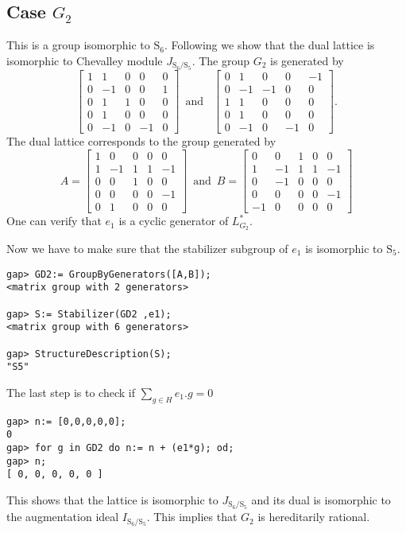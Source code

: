 \documentclass{article}
\theoremstyle{plain}
\theoremstyle{definition}
\begin{document}
\subsection{Case $G_2$}
This is a group isomorphic to $\mathrm{S}_6$. Following \cite{Nicole1} we show that the dual lattice is isomorphic to Chevalley module $J_{\mathrm{S}_6/\mathrm{S}_5}$. The group $G_2$ is generated by 
$$
 \left[ \begin {array}{ccccc} 1&1&0&0&0\\  0&-1&0&0&1
\\  0&1&1&0&0\\  0&1&0&0&0
\\  0&-1&0&-1&0\end {array} \right] 
\,\,\, \text{and } \,\,\,
 \left[ \begin {array}{ccccc} 0&1&0&0&-1\\  0&-1&-1&0
&0\\  1&1&0&0&0\\  0&1&0&0&0
\\  0&-1&0&-1&0\end {array} \right].
$$
The dual lattice corresponds to the group generated by
$$
A = \left[ \begin {array}{ccccc} 1&0&0&0&0\\  1&-1&1&1&-
1\\  0&0&1&0&0\\  0&0&0&0&-1
\\  0&1&0&0&0\end {array} \right] 
 \,\,\, \text{and} \,\,\,
B = \left[ \begin {array}{ccccc} 0&0&1&0&0\\  1&-1&1&1&-
1\\  0&-1&0&0&0\\  0&0&0&0&-1
\\  -1&0&0&0&0\end {array} \right] 
$$
One can verify that $e_1$ is a cyclic generator of $L^*_{G_2}$.

Now we have to make sure that the stabilizer subgroup of $e_1$ is isomorphic to $\mathrm{S}_5$.

\begin{verbatim}
gap> GD2:= GroupByGenerators([A,B]);
<matrix group with 2 generators>

gap> S:= Stabilizer(GD2 ,e1);
<matrix group with 6 generators>

gap> StructureDescription(S);
"S5"
\end{verbatim}
\medskip
The last step is to check if $ \sum_{g \in H} e_1.g= 0$
\begin{verbatim}
gap> n:= [0,0,0,0,0];
0
gap> for g in GD2 do n:= n + (e1*g); od;
gap> n;
[ 0, 0, 0, 0, 0 ]
\end{verbatim}
\medskip
This shows that the lattice is isomorphic to $J_{\mathrm{S}_6/\mathrm{S}_5}$ and its dual is isomorphic to the augmentation ideal $I_{\mathrm{S}_6/\mathrm{S}_5}$. This implies that $G_2$ is hereditarily rational.
\end{document}
